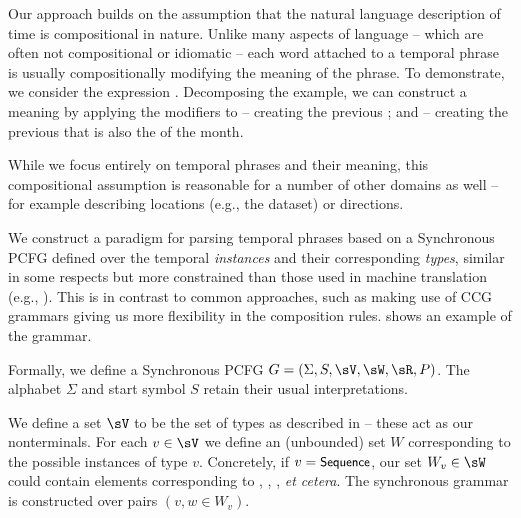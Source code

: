 Our approach builds on the assumption that the natural language description
	of time is compositional in nature.
Unlike many aspects of language  -- which are often not compositional or
	idiomatic -- each word attached to a temporal phrase is 
	usually compositionally modifying the meaning of the phrase.
To demonstrate, we consider the expression .
Decomposing the example, we can construct a meaning by 
	applying the modifiers  to  -- 
	creating the previous ;
	and  -- creating the previous  that is
	also the  of the month.

While we focus entirely on temporal phrases and their meaning, this
	compositional assumption is reasonable for a number of other domains as 
	well -- for example describing locations (e.g., the 
	 dataset) or directions.

We construct a paradigm for parsing temporal phrases based on a Synchronous
	PCFG defined over the temporal \textit{instances} and their
	corresponding \textit{types}, similar in some respects but more
	constrained than those used in machine translation 
	(e.g., ).
This is in contrast to common approaches, such as making use of CCG 
	grammars 
	\cite{key:2000steedman-ccg,key:2004bos-ccg,2011kwiatkowski-semantics}
	giving us more flexibility in the composition rules.
 shows an example of the grammar.

Formally, we define a Synchronous PCFG 
	$G = \left(\Sigma,S,\sV,\sW,\sR,P\right)$.
The alphabet $\Sigma$ and start symbol $S$ retain their usual interpretations.

We define a set $\sV$ to be the set of types as described in
	 -- these act as our nonterminals.
For each $v \in \sV$ we define an (unbounded) set $W$ corresponding to the 
	possible instances of type $v$.
Concretely, if $v=\textsf{\small{Sequence}}$, our set $W_v \in \sW$ could contain elements
	corresponding to , , ,
	\textit{et cetera}.
The synchronous grammar is constructed over pairs $(v,w \in W_v)$.


